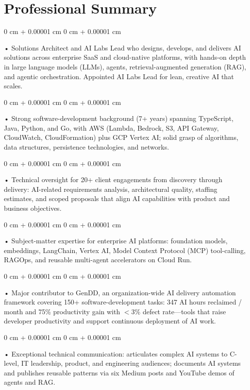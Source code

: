 \documentclass[10pt, letterpaper]{article}
\newenvironment{onecolentry}{
    \begin{adjustwidth}{
        0 cm + 0.00001 cm
    }{
        0 cm + 0.00001 cm
    }
}{
    \end{adjustwidth}
} %
\begin{document}
    \section{Professional Summary}
        \vspace{2 pt }
        \begin{onecolentry}
            • Solutions Architect and AI Labs Lead who designs, develops, and delivers AI solutions across enterprise SaaS and cloud-native platforms, with hands-on depth in large language models (LLMs), agents, retrieval-augmented generation (RAG), and agentic orchestration. Appointed AI Labs Lead for lean, creative AI that scales.
        \end{onecolentry}
        \begin{onecolentry}
            • Strong software-development background (7+ years) spanning TypeScript, Java, Python, and Go, with AWS (Lambda, Bedrock, S3, API Gateway, CloudWatch, CloudFormation) plus GCP Vertex AI; solid grasp of algorithms, data structures, persistence technologies, and networks.
        \end{onecolentry}
        \begin{onecolentry}
            • Technical oversight for 20+ client engagements from discovery through delivery: AI-related requirements analysis, architectural quality, staffing estimates, and scoped proposals that align AI capabilities with product and business objectives.
        \end{onecolentry}
        \begin{onecolentry}
            • Subject-matter expertise for enterprise AI platforms: foundation models, embeddings, LangChain, Vertex AI, Model Context Protocol (MCP) tool-calling, RAGOps, and reusable multi-agent accelerators on Cloud Run.
        \end{onecolentry}
        \begin{onecolentry}
            • Major contributor to GenDD, an organization-wide AI delivery automation framework covering 150+ software-development tasks: 347 AI hours reclaimed / month and 75\% productivity gain with $<$3\% defect rate---tools that raise developer productivity and support continuous deployment of AI work.
        \end{onecolentry}
        \begin{onecolentry}
            • Exceptional technical communication: articulates complex AI systems to C-level, IT leadership, product, and engineering audiences; documents AI systems and publishes reusable patterns via six Medium posts and YouTube demos of agents and RAG.
        \end{onecolentry}
\end{document}
